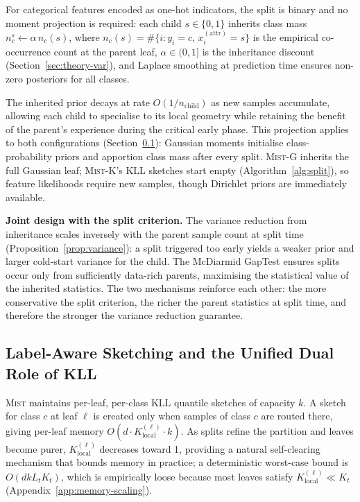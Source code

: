 \documentclass{article}
\newcommand{\mist}{\textsc{Mist}}
\begin{document}
For categorical features encoded as one-hot indicators, the split is
binary and no moment projection is required: each child $s \in \{0,1\}$
inherits class mass $n_c^s \leftarrow \alpha\, n_c(s)$, where
$n_c(s) = \#\{i : y_i = c,\, x_i^{(\mathrm{attr})} = s\}$
is the empirical co-occurrence count at the parent leaf,
$\alpha \in (0,1]$ is the inheritance discount
(Section~\ref{sec:theory-var}), and Laplace smoothing at prediction
time ensures non-zero posteriors for all classes.

The inherited prior decays at rate $O(1/n_{\mathrm{child}})$ as new
samples accumulate, allowing each child to specialise to its local
geometry while retaining the benefit of the parent's experience during
the critical early phase. 
This projection applies to both configurations (Section~\ref{sec:sketch}):
Gaussian moments initialise class-probability priors and apportion class
mass after every split. \mist{}-G inherits the full Gaussian leaf;
\mist{}-K's KLL sketches start empty (Algorithm~\ref{alg:split}), so
feature likelihoods require new samples, though Dirichlet priors are
immediately available.

\noindent
\textbf{Joint design with the split criterion.}
The variance reduction from inheritance scales inversely with the parent
sample count at split time
(Proposition~\ref{prop:variance}): a
split triggered too early yields a weaker prior and larger cold-start
variance for the child. The McDiarmid GapTest ensures splits occur only
from sufficiently data-rich parents, maximising the statistical value
of the inherited statistics. The two mechanisms reinforce each other:
the more conservative the split criterion, the richer the parent
statistics at split time, and therefore the stronger the variance
reduction guarantee. 

\subsection{Label-Aware Sketching and the Unified Dual Role of KLL}
\label{sec:sketch}
\mist{} maintains per-leaf, per-class KLL quantile sketches of capacity
$k$. A sketch for class $c$ at leaf $\ell$ is created only when samples
of class $c$ are routed there, giving per-leaf memory
$O(d \cdot K_{\mathrm{local}}^{(\ell)} \cdot k)$. As splits refine
the partition and leaves become purer, $K_{\mathrm{local}}^{(\ell)}$
decreases toward 1, providing a natural self-clearing mechanism that
bounds memory in practice; a deterministic worst-case bound is
$O(dkL_tK_t)$, which is empirically loose because most leaves satisfy
$K_{\mathrm{local}}^{(\ell)} \ll K_t$ (Appendix~\ref{app:memory-scaling}).
\end{document}
